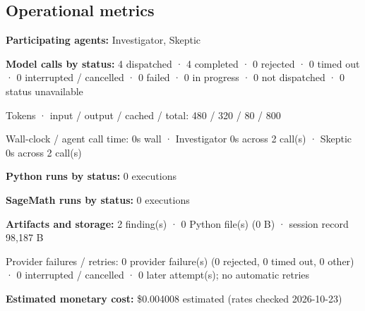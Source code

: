 \documentclass[11pt]{article}
\begin{document}
\subsection{Operational metrics}
\textbf{Participating agents:} Investigator, Skeptic\par
\textbf{Model calls by status:} 4 dispatched · 4 completed · 0 rejected · 0 timed out · 0 interrupted / cancelled · 0 failed · 0 in progress · 0 not dispatched · 0 status unavailable\par
Tokens · input / output / cached / total: 480 / 320 / 80 / 800\par
Wall-clock / agent call time: 0s wall · Investigator 0s across 2 call(s) · Skeptic 0s across 2 call(s)\par
\textbf{Python runs by status:} 0 executions\par
\textbf{SageMath runs by status:} 0 executions\par
\textbf{Artifacts and storage:} 2 finding(s) · 0 Python file(s) (0 B) · session record 98,187 B\par
Provider failures / retries: 0 provider failure(s) (0 rejected, 0 timed out, 0 other) · 0 interrupted / cancelled · 0 later attempt(s); no automatic retries\par
\textbf{Estimated monetary cost:} \$0.004008 estimated (rates checked 2026-10-23)\par
\end{document}
